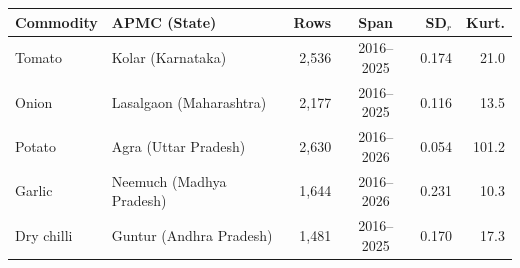 \begin{tabular}{llrcrr}
\toprule
Commodity & APMC (State) & Rows & Span & SD$_r$ & Kurt.\\
\midrule
Tomato & Kolar (Karnataka) & 2{,}536 & 2016--2025 & 0.174 & 21.0\\
Onion & Lasalgaon (Maharashtra) & 2{,}177 & 2016--2025 & 0.116 & 13.5\\
Potato & Agra (Uttar Pradesh) & 2{,}630 & 2016--2026 & 0.054 & 101.2\\
Garlic & Neemuch (Madhya Pradesh) & 1{,}644 & 2016--2026 & 0.231 & 10.3\\
Dry chilli & Guntur (Andhra Pradesh) & 1{,}481 & 2016--2025 & 0.170 & 17.3\\
\bottomrule
\end{tabular}
